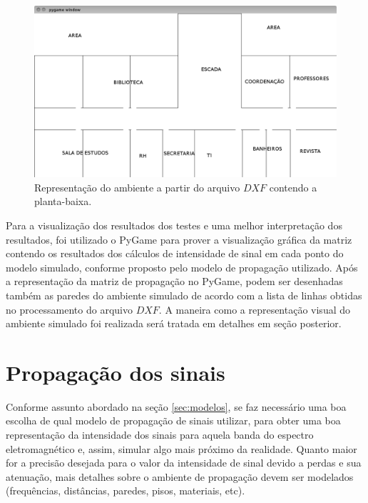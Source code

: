 \documentclass[
	12pt,				%
	twoside,			%
	a4paper,			%
	english,			%
	french,				%
	spanish,			%
	brazil				%
	]{abntex2}
\begin{document}
\begin{figure}[htb]
    \caption{\label{repre_ambiente_dxf_1} Representação do ambiente a partir do arquivo $DXF$ contendo a planta-baixa.}
    \begin{center}
        \includegraphics[scale=0.4]{imagens/planta-labels.jpg}
    \end{center}
\end{figure}

Para a visualização dos resultados dos testes e uma melhor interpretação
dos resultados, foi utilizado o PyGame para prover a visualização
gráfica da matriz contendo os resultados dos cálculos de intensidade de
sinal em cada ponto do modelo simulado, conforme proposto pelo modelo de
propagação utilizado. Após a representação da matriz de propagação no
PyGame, podem ser desenhadas também as paredes do ambiente simulado de
acordo com a lista de linhas obtidas no processamento do arquivo
\(DXF\). A maneira como a representação visual do ambiente simulado foi
realizada será tratada em detalhes em seção posterior.

\section{Propagação dos sinais}\label{propagauxe7uxe3o-dos-sinais}

Conforme assunto abordado na seção \ref{sec:modelos}, se faz necessário
uma boa escolha de qual modelo de propagação de sinais utilizar, para
obter uma boa representação da intensidade dos sinais para aquela banda
do espectro eletromagnético e, assim, simular algo mais próximo da
realidade. Quanto maior for a precisão desejada para o valor da
intensidade de sinal devido a perdas e sua atenuação, mais detalhes
sobre o ambiente de propagação devem ser modelados (frequências,
distâncias, paredes, pisos, materiais, etc).
\end{document}
